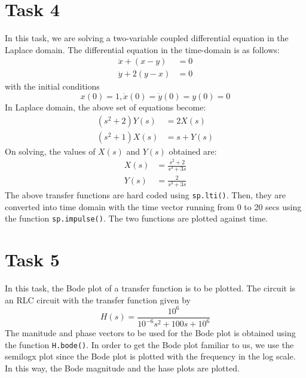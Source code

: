 \documentclass[11pt, a4paper]{article}
\begin{document}
\section{Task 4}
In this task, we are solving a two-variable coupled differential equation in the Laplace domain. The differential equation in the time-domain is as follows:
\begin{equation*}
\begin{split}
\ddot x + (x - y) &= 0
\\ \ddot y + 2(y - x) &= 0
\end{split}
\end{equation*}
with the initial conditions
\begin{equation*}
x(0) = 1, \dot x(0) = \dot y(0) = y(0) = 0
\end{equation*}
In Laplace domain, the above set of equations become:
\begin{equation*}
\begin{split}
(s^2 + 2)Y(s) &= 2X(s)
\\ (s^2 + 1)X(s) &= s + Y(s)
\end{split}
\end{equation*}
On solving, the values of \(X(s)\) and \(Y(s)\) obtained are:
\begin{equation*}
\begin{split}
X(s) &= \frac{s^2 + 2}{s^3 + 3s}
\\ Y(s) &= \frac{2}{s^3 + 3s}
\end{split}
\end{equation*}
The above transfer functions are hard coded using \texttt{sp.lti()}. Then, they are converted into time domain with the time vector running from 0 to 20 secs using the function \texttt{sp.impulse()}. The two functions are plotted against time.

\section{Task 5}
In this task, the Bode plot of a transfer function is to be plotted. The circuit is an RLC circuit with the transfer function given by
\begin{equation*}
H(s) = \frac{10^6}{10^{-6}s^2 + 100s + 10^6}
\end{equation*}
The manitude and phase vectors to be used for the Bode plot is obtained using the function \texttt{H.bode()}. In order to get the Bode plot familiar to us, we use the semilogx plot since the Bode plot is plotted with the frequency in the log scale. In this way, the Bode magnitude and the hase plots are plotted.
\end{document}
